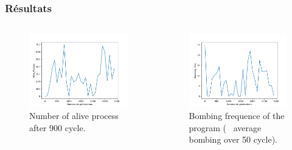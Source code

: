 \documentclass{beamer}
\begin{document}
\begin{frame}
\frametitle{Résultats}
\begin{columns}[c]
    \begin{column}{.45\textwidth}
    \begin{figure}
        \centering
        \includegraphics[width=1\textwidth]{images/Alive_Process.png}
        \caption{Number of alive process after 900 cycle.}
    \end{figure}    
      
    \end{column}
    \begin{column}{.45\textwidth}
    \begin{figure}
        \centering
        \includegraphics[width=1\textwidth]{images/Bombing_Freq.png}
        \caption{Bombing frequence of the program (~ average bombing over 50 cycle).}
    \end{figure}
    \end{column}
\end{columns}

\end{frame}
\end{document}

